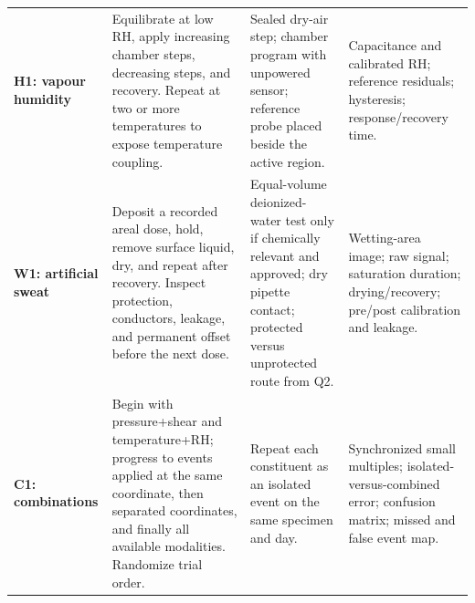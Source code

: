 \begin{tabularx}{\linewidth}{>{\raggedright\arraybackslash\bfseries\color{AUBRed}}p{2.8cm}
                            >{\raggedright\arraybackslash}p{5.0cm}Y Y}
H1: vapour humidity & Equilibrate at low RH, apply increasing chamber steps,
decreasing steps, and recovery. Repeat at two or more temperatures to expose
temperature coupling. & Sealed dry-air step; chamber program with unpowered
sensor; reference probe placed beside the active region. & Capacitance and
calibrated RH; reference residuals; hysteresis; response/recovery time. \\
W1: artificial sweat & Deposit a recorded areal dose, hold, remove surface
liquid, dry, and repeat after recovery. Inspect protection, conductors, leakage,
and permanent offset before the next dose. & Equal-volume deionized-water test
only if chemically relevant and approved; dry pipette contact; protected versus
unprotected route from Q2. & Wetting-area image; raw signal; saturation duration;
drying/recovery; pre/post calibration and leakage. \\
C1: combinations & Begin with pressure+shear and temperature+RH; progress to
events applied at the same coordinate, then separated coordinates, and finally
all available modalities. Randomize trial order. & Repeat each constituent as
an isolated event on the same specimen and day. & Synchronized small multiples;
isolated-versus-combined error; confusion matrix; missed and false event map. \\
\end{tabularx}
\endgroup
{}

\vspace{0.6em}

